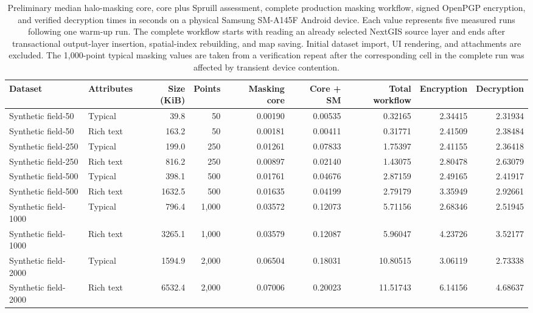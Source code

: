 \begin{table}[ht!]
\centering
\caption{Preliminary median halo-masking core, core plus Spruill assessment, complete production masking workflow, signed OpenPGP encryption, and verified decryption times in seconds on a physical Samsung SM-A145F Android device. Each value represents five measured runs following one warm-up run. The complete workflow starts with reading an already selected NextGIS source layer and ends after transactional output-layer insertion, spatial-index rebuilding, and map saving. Initial dataset import, UI rendering, and attachments are excluded. The 1,000-point typical masking values are taken from a verification repeat after the corresponding cell in the complete run was affected by transient device contention.}
\label{tab:mobile-mask-encryption-times-preliminary}
\begin{tabular}{llrrrrrrr}
\hline
Dataset & Attributes & Size (KiB) & Points & Masking core & Core + SM & Total workflow & Encryption & Decryption \\
\hline
Synthetic field-50 & Typical & 39.8 & 50 & 0.00190 & 0.00535 & 0.32165 & 2.34415 & 2.31934 \\
Synthetic field-50 & Rich text & 163.2 & 50 & 0.00181 & 0.00411 & 0.31771 & 2.41509 & 2.38484 \\
Synthetic field-250 & Typical & 199.0 & 250 & 0.01261 & 0.07833 & 1.75397 & 2.41155 & 2.36418 \\
Synthetic field-250 & Rich text & 816.2 & 250 & 0.00897 & 0.02140 & 1.43075 & 2.80478 & 2.63079 \\
Synthetic field-500 & Typical & 398.1 & 500 & 0.01761 & 0.04676 & 2.87159 & 2.49165 & 2.41917 \\
Synthetic field-500 & Rich text & 1632.5 & 500 & 0.01635 & 0.04199 & 2.79179 & 3.35949 & 2.92661 \\
Synthetic field-1000 & Typical & 796.4 & 1,000 & 0.03572 & 0.12073 & 5.71156 & 2.68346 & 2.51945 \\
Synthetic field-1000 & Rich text & 3265.1 & 1,000 & 0.03579 & 0.12087 & 5.96047 & 4.23726 & 3.52177 \\
Synthetic field-2000 & Typical & 1594.9 & 2,000 & 0.06504 & 0.18031 & 10.80515 & 3.06119 & 2.73338 \\
Synthetic field-2000 & Rich text & 6532.4 & 2,000 & 0.07006 & 0.20023 & 11.51743 & 6.14156 & 4.68637 \\
\hline
\end{tabular}
\end{table}
